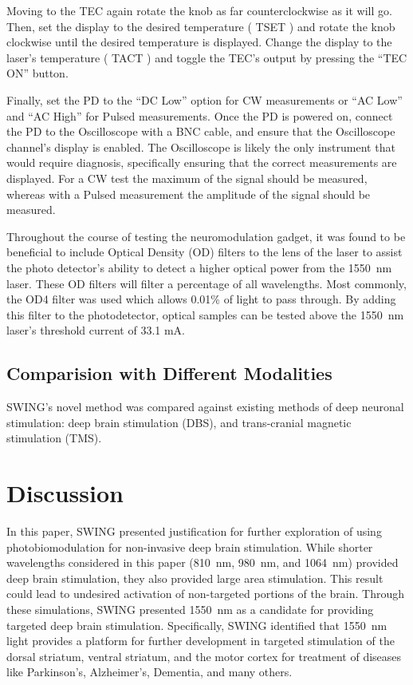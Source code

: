 \documentclass[journal,twoside,web]{ieeecolor}
\begin{document}
Moving to the TEC again rotate the knob as far counterclockwise as it will go. Then, set the display to the desired temperature (
TSET 
) and rotate the knob clockwise until the desired temperature is displayed. Change the display to the laser's temperature (
TACT 
) and toggle the TEC's output by pressing the “TEC ON” button. 

Finally, set the PD to the “DC Low” option for CW measurements or “AC Low” and “AC High” for Pulsed measurements. Once the PD is powered on, connect the PD to the 
Oscilloscope with a BNC cable, and ensure that the Oscilloscope channel's display is enabled. The Oscilloscope is likely the only instrument that would require 
diagnosis, specifically ensuring that the correct measurements are displayed. For a CW test the maximum of the signal should be measured, whereas with a Pulsed 
measurement the amplitude of the signal should be measured. 

Throughout the course of testing the neuromodulation gadget, it was found to be beneficial to include Optical Density (OD) filters to the lens of the laser to assist 
the photo detector's ability to detect a higher optical power from the 1550~nm laser. These OD filters will filter a percentage of all wavelengths. Most commonly, the 
OD4 filter was used which allows 0.01\% of light to pass through. By adding this filter to the photodetector, optical samples can be tested above the 1550~nm laser’s 
threshold current of 33.1 mA. 

\subsection{Comparision with Different Modalities}
SWING's novel method was compared against existing methods of deep neuronal stimulation: deep brain stimulation (DBS), and trans-cranial magnetic stimulation (TMS). 



\section{Discussion}
\label{sec:next steps}
In this paper, SWING presented justification for further exploration of using photobiomodulation for non-invasive deep brain stimulation. While 
shorter wavelengths considered in this paper (810~nm, 980~nm, and 1064~nm) provided deep brain stimulation, they also provided large area stimulation. 
This result could lead to undesired activation of non-targeted portions of the brain. Through these simulations, SWING presented 1550~nm as a candidate for 
providing targeted deep brain stimulation. Specifically, SWING identified that 1550~nm light provides a platform for further development in targeted 
stimulation of the dorsal striatum, ventral striatum, and the motor cortex for treatment of diseases like Parkinson's, Alzheimer's, Dementia, and many others.
\end{document}
